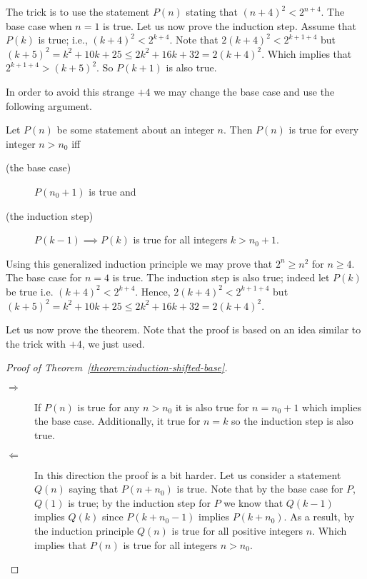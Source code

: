 The trick is to use the statement $P(n)$ stating that $(n + 4)^2 < 2^{n + 4}$.
The base case when $n = 1$ is true.
Let us now prove the induction step. Assume that $P(k)$ is true; i.e.,
$(k + 4)^2 < 2^{k + 4}$. Note that $2(k + 4)^2 < 2^{k + 1 + 4}$ but
$(k + 5)^2 = k^2 + 10k + 25 \le 2k^2 + 16k + 32 = 2(k + 4)^2$.
Which implies that
$2^{k + 1 + 4} > (k + 5)^2$. So $P(k + 1)$ is also true.

In order to avoid this strange $+ 4$ we may change the base
case and use the following argument.

\begin{theorem}
\label{theorem:induction-shifted-base}
    Let $P(n)$ be some statement about an integer $n$.
    Then $P(n)$ is true for every integer $n > n_0$ iff
    \begin{description}
        \item [(the base case)] $P(n_0 + 1)$ is true and
        \item [(the induction step)] $P(k - 1) \implies P(k)$ is true for all
            integers $k > n_0 + 1$.
    \end{description}
\end{theorem}

Using this generalized induction principle we may prove that $2^n \ge n^2$ for
$n \ge 4$. The base case for $n = 4$ is true. The induction step is also true;
indeed let $P(k)$ be true i.e. $(k + 4)^2 < 2^{k + 4}$. Hence,
$2(k + 4)^2 < 2^{k + 1 + 4}$ but
$(k + 5)^2 = k^2 + 10k + 25 \le 2k^2 + 16k + 32 = 2(k + 4)^2$.

Let us now prove the theorem. Note that the proof is based on an idea similar
to the trick with $+ 4$, we just used.
\begin{proof}[Proof of Theorem~\ref{theorem:induction-shifted-base}]
    \begin{description}
        \item[$\Rightarrow$] If $P(n)$ is true for any $n > n_0$ it is also true
            for $n = n_0 + 1$ which implies the base case. Additionally, it true for
            $n = k$ so the induction step is also true.
        \item[$\Leftarrow$] In this direction the proof is a bit harder. Let us
            consider a statement $Q(n)$ saying that $P(n + n_0)$ is true. Note that
            by the base case for $P$, $Q(1)$ is true; by the induction step for $P$
            we know that $Q(k - 1)$ implies $Q(k)$ since $P(k + n_0 - 1)$
            implies $P(k + n_0)$. As a result, by the induction
            principle $Q(n)$ is true for all positive integers $n$. Which implies
            that $P(n)$ is true for all integers $n > n_0$.
    \end{description}
\end{proof}

